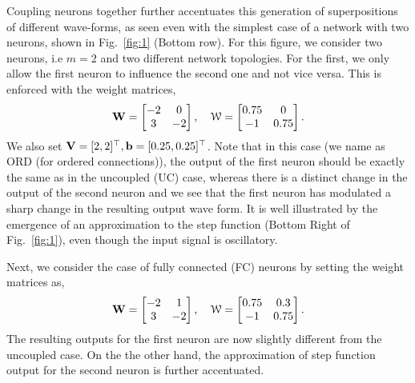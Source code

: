 \documentclass{article} \usepackage{iclr2021_conference,times}
\newcommand{\cW}{\EuScript{W}}
\newcommand{\bW}{{\bf W}}
\newcommand{\bb}{{\bf b}}
\newcommand{\bV}{{\bf V}}
\newcommand{\fref}[1] {Fig.~\ref{#1}}
\begin{document}
Coupling neurons together further accentuates this generation of superpositions of different wave-forms, as seen even with the simplest case of a network with two neurons, shown in \fref{fig:1} (Bottom row). For this figure, we consider two neurons, i.e $m=2$ and two different network topologies. For the first, we only allow the first neuron to influence the second one and not vice versa. This is enforced with the weight matrices,
$$
\bW = \begin{bmatrix}
        - 2 & 0 \\      
        3 & -2 
      \end{bmatrix}, \quad
    \cW =   \begin{bmatrix}
        0.75 & 0 \\
        -1 & 0.75 
      \end{bmatrix}.  
$$
We also set $\bV = [2,2]^\top, \bb = [0.25,0.25]^\top$. Note that in this case (we name as ORD (for ordered connections)), the output of the first neuron should be exactly the same as in the uncoupled (UC) case, whereas there is a distinct change in the output of the second neuron and we see that the first neuron has modulated a sharp change in the resulting output wave form. It is well illustrated by the emergence of an approximation to the step function (Bottom Right of \fref{fig:1}), even though the input signal is oscillatory. 

Next, we consider the case of fully connected (FC) neurons by setting the weight matrices as,
$$
\bW = \begin{bmatrix}
        - 2 & 1 \\      
        3 & -2 
      \end{bmatrix}, \quad
    \cW =   \begin{bmatrix}
        0.75 & 0.3 \\
        -1 & 0.75 
      \end{bmatrix}.  
$$
The resulting outputs for the first neuron are now slightly different from the uncoupled case. On the the other hand, the approximation of step function output for the second neuron is further accentuated. 
\end{document}
